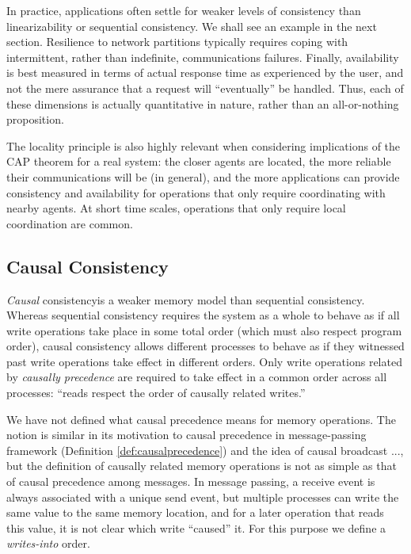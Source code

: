 \documentclass[]             %
{NASA}                       %
\theoremstyle{definition}
\begin{document}
In practice, applications often settle for weaker levels of
consistency than linearizability or sequential consistency. We shall
see an example in the next section. Resilience to network partitions
typically requires coping with intermittent, rather than indefinite,
communications failures. Finally, availability is best measured in
terms of actual response time as experienced by the user, and not the
mere assurance that a request will ``eventually'' be handled. Thus,
each of these dimensions is actually quantitative in nature, rather
than an all-or-nothing proposition.

The locality principle is also highly relevant when considering
implications of the CAP theorem for a real system: the closer agents
are located, the more reliable their communications will be (in
general), and the more applications can provide consistency and
availability for operations that only require coordinating with nearby
agents. At short time scales, operations that only require local
coordination are common.

\subsection{Causal Consistency}
\label{ssec:causal-consistency}
\emph{Causal} consistency\citationneeded is a weaker memory model than
sequential consistency. Whereas sequential consistency requires the
system as a whole to behave as if all write operations take place in
some total order (which must also respect program order), causal
consistency allows different processes to behave as if they witnessed
past write operations take effect in different orders. Only write
operations related by \emph{causally precedence} are required to take
effect in a common order across all processes: ``reads respect the
order of causally related writes.'' \citationneeded

We have not defined what causal precedence means for memory
operations. The notion is similar in its motivation to causal
precedence in message-passing framework (Definition
\ref{def:causalprecedence}) and the idea of causal broadcast
\citationneeded..., but the definition of causally related memory
operations is not as simple as that of causal precedence among
messages. In message passing, a receive event is always associated
with a unique send event, but multiple processes can write the same
value to the same memory location, and for a later operation that
reads this value, it is not clear which write ``caused'' it. For this
purpose we define a \emph{writes-into} order.
\end{document}
